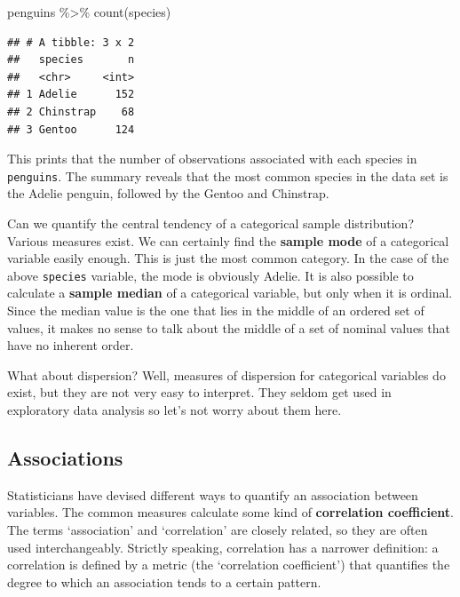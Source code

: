 \documentclass[
]{book}
\newenvironment{Shaded}{\begin{snugshade}}{\end{snugshade}}
\newcommand{\FunctionTok}[1]{\textcolor[rgb]{0.00,0.00,0.00}{#1}}
\newcommand{\NormalTok}[1]{#1}
\newcommand{\SpecialCharTok}[1]{\textcolor[rgb]{0.00,0.00,0.00}{#1}}
\begin{document}
\begin{Shaded}
\begin{Highlighting}[]
\NormalTok{penguins }\SpecialCharTok{\%\textgreater{}\%} \FunctionTok{count}\NormalTok{(species)}
\end{Highlighting}
\end{Shaded}

\begin{verbatim}
## # A tibble: 3 x 2
##   species       n
##   <chr>     <int>
## 1 Adelie      152
## 2 Chinstrap    68
## 3 Gentoo      124
\end{verbatim}

This prints that the number of observations associated with each species in \texttt{penguins}. The summary reveals that the most common species in the data set is the Adelie penguin, followed by the Gentoo and Chinstrap.

Can we quantify the central tendency of a categorical sample distribution? Various measures exist. We can certainly find the \textbf{sample mode} of a categorical variable easily enough. This is just the most common category. In the case of the above \texttt{species} variable, the mode is obviously Adelie. It is also possible to calculate a \textbf{sample median} of a categorical variable, but only when it is ordinal. Since the median value is the one that lies in the middle of an ordered set of values, it makes no sense to talk about the middle of a set of nominal values that have no inherent order.

What about dispersion? Well, measures of dispersion for categorical variables do exist, but they are not very easy to interpret. They seldom get used in exploratory data analysis so let's not worry about them here.

\hypertarget{associations-1}{%
\subsection{Associations}\label{associations-1}}

Statisticians have devised different ways to quantify an association between variables. The common measures calculate some kind of \textbf{correlation coefficient}. The terms `association' and `correlation' are closely related, so they are often used interchangeably. Strictly speaking, correlation has a narrower definition: a correlation is defined by a metric (the `correlation coefficient') that quantifies the degree to which an association tends to a certain pattern.
\end{document}

